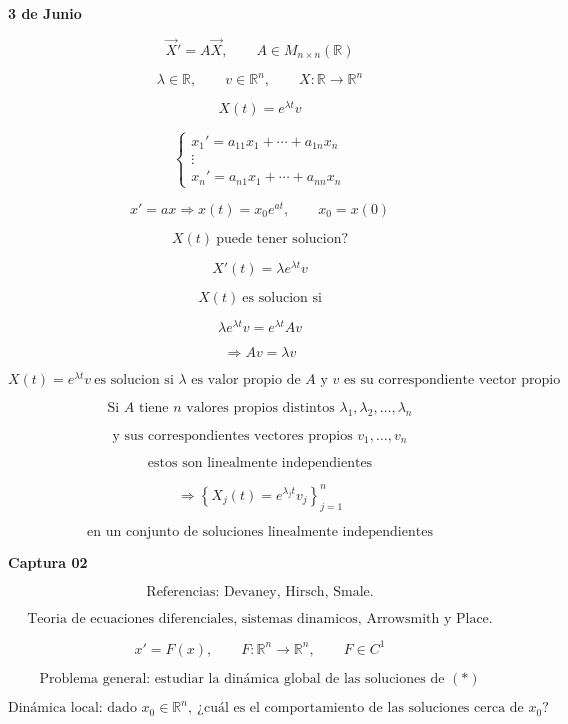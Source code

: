 ﻿\documentclass[11pt,letterpaper]{article}
\begin{document}
\textbf{3 de Junio}

\[
\vec{X}' = A\vec{X}, \qquad A \in M_{n\times n}(\mathbb{R})
\]

\[
\lambda \in \mathbb{R}, \qquad v \in \mathbb{R}^n, \qquad X:\mathbb{R}\to\mathbb{R}^n
\]

\[
X(t)=e^{\lambda t}v
\]

\[
\begin{cases}
x_1' = a_{11}x_1 + \cdots + a_{1n}x_n\\
\vdots\\
x_n' = a_{n1}x_1 + \cdots + a_{nn}x_n
\end{cases}
\]

\[
x' = ax \Rightarrow x(t)=x_0e^{at}, \qquad x_0=x(0)
\]

\[
X(t)\ \text{puede tener solucion?}
\]

\[
X'(t)=\lambda e^{\lambda t}v
\]

\[
X(t)\ \text{es solucion si}
\]

\[
\lambda e^{\lambda t}v=e^{\lambda t}Av
\]

\[
\Rightarrow Av=\lambda v
\]

\[
X(t)=e^{\lambda t}v\ \text{es solucion si } \lambda \text{ es valor propio de } A \text{ y } v \text{ es su correspondiente vector propio}
\]

\[
\text{Si } A \text{ tiene } n \text{ valores propios distintos } \lambda_1,\lambda_2,\ldots,\lambda_n
\]

\[
\text{y sus correspondientes vectores propios } v_1,\ldots,v_n
\]

\[
\text{estos son linealmente independientes}
\]

\[
\Rightarrow \left\{X_j(t)=e^{\lambda_j t}v_j\right\}_{j=1}^n
\]

\[
\text{en un conjunto de soluciones linealmente independientes}
\]

\newpage

\textbf{Captura 02}

\[
\text{Referencias: Devaney, Hirsch, Smale.}
\]

\[
\text{Teoria de ecuaciones diferenciales, sistemas dinamicos, Arrowsmith y Place.}
\]

\[
x' = F(x), \qquad F:\mathbb{R}^n\to\mathbb{R}^n,\qquad F\in C^1
\]

\[
\text{Problema general: estudiar la din\'amica global de las soluciones de }(*)
\]

\[
\text{Din\'amica local: dado } x_0\in\mathbb{R}^n,\ \text{¿cu\'al es el comportamiento de las soluciones cerca de }x_0?
\]
\end{document}

